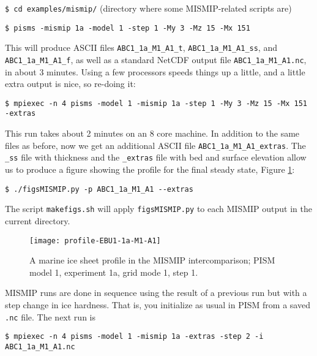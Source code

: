 \texttt{\$ cd examples/mismip/}  \hfill \scriptsize(directory where some MISMIP-related scripts are)\normalsize

\begin{verbatim}
$ pisms -mismip 1a -model 1 -step 1 -My 3 -Mz 15 -Mx 151
\end{verbatim}

\noindent This will produce ASCII files \texttt{ABC1_1a_M1_A1_t}, \texttt{ABC1_1a_M1_A1_ss}, and \texttt{ABC1_1a_M1_A1_f}, as well as a standard NetCDF output file \texttt{ABC1_1a_M1_A1.nc}, in about 3 minutes.  Using a few processors speeds things up a little, and a little extra output is nice, so re-doing it:

\begin{verbatim}
$ mpiexec -n 4 pisms -model 1 -mismip 1a -step 1 -My 3 -Mz 15 -Mx 151 -extras
\end{verbatim}

\noindent This run takes about 2 minutes on an 8 core machine.  In addition to the same files as before, now we get an additional ASCII file \texttt{ABC1_1a_M1_A1_extras}.  The \texttt{_ss} file with thickness and the \texttt{_extras} file with bed and surface elevation allow us to produce a figure showing the profile for the final steady state, Figure \ref{fig:MISMIPmodel1exper1aM1A1}:

\begin{verbatim}
$ ./figsMISMIP.py -p ABC1_1a_M1_A1 --extras
\end{verbatim}

\noindent The script \texttt{makefigs.sh} will apply \texttt{figsMISMIP.py} to each MISMIP output in the current directory.

\begin{figure}[ht]
\centering
\texttt{[image: profile-EBU1-1a-M1-A1]}
\caption{A marine ice sheet profile in the MISMIP intercomparison; PISM model 1, experiment 1a, grid mode 1, step 1.}
\label{fig:MISMIPmodel1exper1aM1A1}
\end{figure}

MISMIP runs are done in sequence using the result of a previous run but with a step change in ice hardness.  That is, you initialize as usual in PISM from a saved \texttt{.nc} file.  The next run is

\begin{verbatim}
$ mpiexec -n 4 pisms -model 1 -mismip 1a -extras -step 2 -i ABC1_1a_M1_A1.nc
\end{verbatim}

